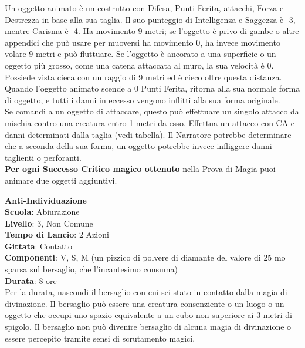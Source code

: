 \bigskip

\begin{multicols}{2}

Un oggetto animato è un costrutto con Difesa, Punti Ferita, attacchi, Forza e Destrezza in base alla sua taglia. Il suo punteggio di Intelligenza e Saggezza è -3, mentre Carisma è -4. Ha movimento 9 metri; se l'oggetto è privo di gambe o altre appendici che può usare per muoversi ha movimento 0, ha invece movimento volare 9 metri e può fluttuare. Se l'oggetto è ancorato a una superficie o un oggetto più grosso, come una catena attaccata al muro, la sua velocità è 0. Possiede vista cieca con un raggio di 9 metri ed è cieco oltre questa distanza.\\
Quando l'oggetto animato scende a 0 Punti Ferita, ritorna alla sua normale forma di oggetto, e tutti i danni in eccesso vengono inflitti alla sua forma originale.\\
Se comandi a un oggetto di attaccare, questo può effettuare un singolo attacco da mischia contro una creatura entro 1 metri da esso. Effettua un attacco con CA e danni determinati dalla taglia (vedi tabella). Il Narratore potrebbe determinare che a seconda della sua forma, un oggetto potrebbe invece infliggere danni taglienti o perforanti.\\
\textbf{Per ogni Successo Critico magico ottenuto} nella Prova di Magia puoi animare due oggetti aggiuntivi.

\medskip\textbf{Anti-Individuazione}\\
\textbf{Scuola}: Abiurazione\\
\textbf{Livello}: 3, Non Comune\\
\textbf{Tempo di Lancio}: 2 Azioni\\
\textbf{Gittata}: Contatto\\
\textbf{Componenti}: V, S, M (un pizzico di polvere di diamante del valore di 25 mo sparsa sul bersaglio, che l'incantesimo consuma)\\
\textbf{Durata}: 8 ore\\
Per la durata, nascondi il bersaglio con cui sei stato in contatto dalla magia di divinazione. Il bersaglio può essere una creatura consenziente o un luogo o un oggetto che occupi uno spazio equivalente a un cubo non superiore ai 3 metri di spigolo. Il bersaglio non può divenire bersaglio di alcuna magia di divinazione o essere percepito tramite sensi di scrutamento magici.


\end{multicols}
